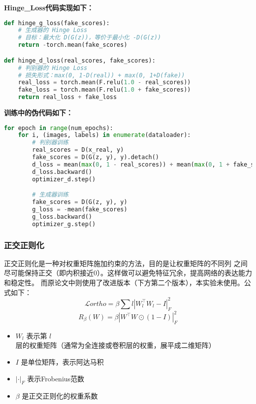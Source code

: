 \documentclass[12pt, a4paper]{article}
\begin{document}
\noindent\textbf{Hinge\_Loss代码实现如下：}
\begin{lstlisting}[language=Python]
def hinge_g_loss(fake_scores):
    # 生成器的 Hinge Loss
    # 目标：最大化 D(G(z))，等价于最小化 -D(G(z))
    return -torch.mean(fake_scores)

def hinge_d_loss(real_scores, fake_scores):
    # 判别器的 Hinge Loss
    # 损失形式：max(0, 1-D(real)) + max(0, 1+D(fake))
    real_loss = torch.mean(F.relu(1.0 - real_scores))
    fake_loss = torch.mean(F.relu(1.0 + fake_scores))
    return real_loss + fake_loss
\end{lstlisting}
\vspace{0.5cm}
\noindent\textbf{训练中的伪代码如下：}
\begin{lstlisting}[language=Python]
for epoch in range(num_epochs):
    for i, (images, labels) in enumerate(dataloader):
        # 判别器训练
        real_scores = D(x_real, y)
        fake_scores = D(G(z, y), y).detach()
        d_loss = mean(max(0, 1 - real_scores)) + mean(max(0, 1 + fake_scores))
        d_loss.backward()
        optimizer_d.step()

        # 生成器训练
        fake_scores = D(G(z, y), y)
        g_loss = -mean(fake_scores)
        g_loss.backward()
        optimizer_g.step()
\end{lstlisting}  

\subsubsection{正交正则化}
正交正则化是一种对权重矩阵施加约束的方法，目的是让权重矩阵的不同列
之间尽可能保持正交（即内积接近0）。这样做可以避免特征冗余，提高网络的表达能力和稳定性。
而原论文中则使用了改进版本（下方第二个版本），本实验未使用。公式如下：
$$ \mathcal{L}{ortho} = \beta \sum{l} \left| W_l^\top W_l - I \right|_F^2 $$
$$ R_\beta(W) = \beta \left| W^\top W \odot (1 - I) \right|_F^2 $$
\begin{itemize}
    \item $W_l$ 表示第 $l$ 层的权重矩阵（通常为全连接或卷积层的权重，展平成二维矩阵）
    \item $I$ 是单位矩阵，\odot 表示阿达马积
    \item $|\cdot|_F$ 表示Frobenius范数
    \item $\beta$ 是正交正则化的权重系数
\end{itemize}
\end{document}
